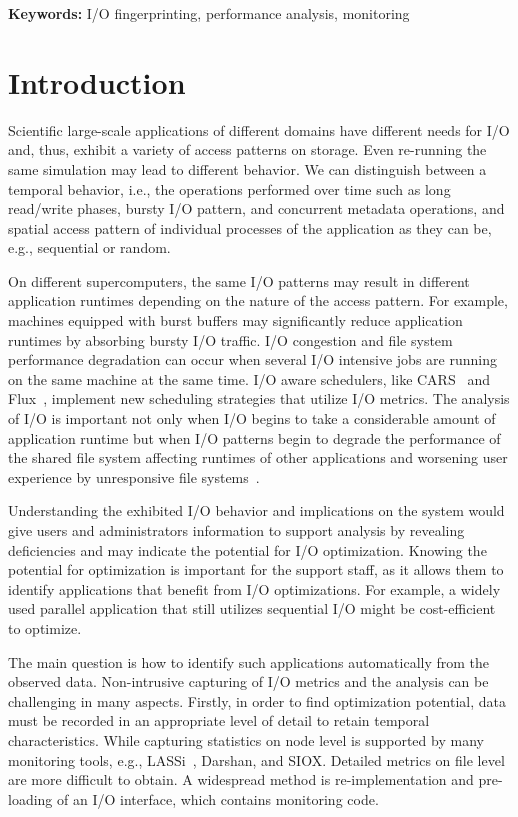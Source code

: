 \documentclass{jhps}
\begin{document}
\textbf{Keywords: }I/O fingerprinting, performance analysis, monitoring

\section{Introduction}
Scientific large-scale applications of different domains have different needs for I/O and, thus, exhibit a variety of access patterns on storage.
Even re-running the same simulation may lead to different behavior.
We can distinguish between a temporal behavior, i.e., the operations performed over time such as long read/write phases, bursty I/O pattern, and concurrent metadata operations, and spatial access pattern of individual processes of the application as they can be, e.g., sequential or random.

On different supercomputers, the same I/O patterns may result in different application runtimes depending on the nature of the access pattern.
For example, machines equipped with burst buffers \cite{10.1007/978-3-030-02465-9_9, 7004215,Landsteiner2016ArchitectureAD} may significantly reduce application runtimes by absorbing bursty I/O traffic.
I/O congestion and file system performance degradation can occur when several I/O intensive jobs are running on the same machine at the same time.
I/O aware schedulers, like CARS~\cite{LIANG201925} and Flux~\cite{flux}, implement new scheduling strategies that utilize I/O metrics.
The analysis of I/O is important not only when I/O begins to take a considerable amount of application runtime but when I/O patterns begin to degrade the performance of the shared file system affecting runtimes of other applications and worsening user experience by unresponsive file systems~\cite{10.1007/978-3-030-02465-9_5}.

Understanding the exhibited I/O behavior and implications on the system would give users and administrators information to support analysis by revealing deficiencies and may indicate the potential for I/O optimization.
Knowing the potential for optimization is important for the support staff, as it allows them to identify applications that benefit from I/O optimizations.
For example, a widely used parallel application that still utilizes sequential I/O might be cost-efficient to optimize.

The main question is how to identify such applications automatically from the observed data.
Non-intrusive capturing of I/O metrics and the analysis can be challenging in many aspects.
Firstly, in order to find optimization potential, data must be recorded in an appropriate level of detail to retain temporal characteristics.
While capturing statistics on node level is supported by many monitoring tools, e.g., LASSi~\cite{sivalingam2019lassi}, Darshan\cite{hpcdarshan}, and SIOX\cite{TSACAMAOOP14}.
Detailed metrics on file level are more difficult to obtain.
A widespread method is re-implementation and pre-loading of an I/O interface, which contains monitoring code.
\end{document}
